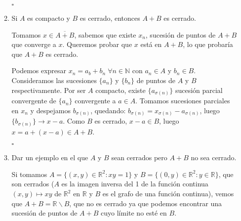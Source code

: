 \documentclass[12pt,letterpaper]{article}
\newcommand{\R}{\mathbb{R}}
\newcommand{\N}{\mathbb{N}}
\newcommand{\cqd}{\hfill\ensuremath{\square}}
\begin{document}
\begin{enumerate}
\begin{enumerate}
\cqd

\item Si $A$ es compacto y $B$ es cerrado, entonces $A+B$ es cerrado.

Tomamos $x\in \overline{A+B}$, sabemos que existe $x_n$, sucesión de puntos de $A+B$ que converge a $x$. Queremos probar que $x$ está en $A+B$, lo que probaría que $A+B$ es cerrado.

Podemos expresar $x_n=a_b+b_n \; \forall n \in\N$ con $a_n\in A$ y $b_n\in B$. Consideramos las sucesiones $\{a_n\}$ y $\{b_n\}$ de puntos de $A$ y $B$ respectivamente. Por ser $A$ compacto, existe $\{a_{\sigma(n)}\}$ sucesión parcial convergente de $\{a_{n}\}$ convergente a $a\in A$. Tomamos sucesiones parciales en $x_n$ y despejamos $b_{\sigma(n)}$, quedando: $b_{\sigma(n)}=x_{\sigma(n)}-a_{\sigma(n)}$, luego $\{b_{\sigma(n)}\}\longrightarrow x-a$. Como $B$ es cerrado, $x-a\in B$, luego $x=a+(x-a)\in A+B$.

\cqd

\item Dar un ejemplo en el que $A$ y $B$ sean cerrados pero $A+B$ no sea cerrado.

Si tomamos $A=\{(x,y)\in\R^2:xy=1\}$ y $B=\{(0,y)\in\R^2:y\in\R\}$, que son cerrados ($A$ es la imagen inversa del 1 de la función continua $(x,y)\mapsto xy$ de $\R^2$ en $\R$ y $B$ es el grafo de una función continua), vemos que $A+B=\R\smallsetminus B$, que no es cerrado ya que podemos encontrar una sucesión de puntos de $A+B$ cuyo límite no esté en $B$.

\end{enumerate}

\end{enumerate}
\end{document}
